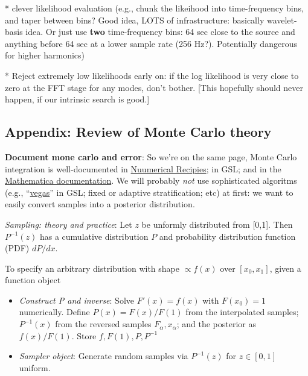 \documentclass[twocolumn,prd,nofootinbib]{revtex4}
\begin{document}

* clever likelihood evaluation (e.g., chunk the likeihood into time-frequency bins, and taper between bins? Good idea,
LOTS of infrastructure: basically wavelet-basis idea.  Or just use \textbf{two} time-frequency bins: 64 sec close to the
source and anything before 64 sec at a lower sample rate (256 Hz?).  Potentially dangerous for higher harmonics)

* Reject extremely low likelihoods early on: if the log likelihood is very close to zero at the FFT stage for any modes,
don't bother.  [This hopefully should never happen, if our intrinsic search is good.]




\subsection{Appendix: Review of Monte Carlo theory}

\noindent \textbf{Document mone carlo and error}: So we're on the same page, Monte Carlo integration is well-documented in \href{http://nr.com}{Nuumerical Recipies}; in
GSL; and in the \href{http://reference.wolfram.com/mathematica/tutorial/NIntegrateIntegrationStrategies.html}{Mathematica documentation}.  We will probably \emph{not} use sophisticated algoritms (e.g.,
``\href{http://www.gnu.org/software/gsl/manual/html_node/VEGAS.html#VEGAS}{vegas}'' in GSL; fixed or adaptive stratification; etc) at first: we want to easily convert samples into a posterior distribution.


\emph{Sampling: theory and practice}: Let $z$ be unformly distributed from [0,1]. Then $P^{-1}(z)$ has a cumulative distribution $P$
and probability distribution function (PDF) $dP/dx$.  

To specify an arbitrary distribution with shape $\propto f(x)$ over $[x_0,x_1]$, given a function object
\begin{itemize}
\item \emph{Construct P and inverse}: Solve $F'(x)=f(x)$ with $F(x_0)=1$ numerically.  Define $P(x)=F(x)/F(1)$ from the
  interpolated samples; $P^{-1}(x)$ from the reversed samples $F_\alpha,x_\alpha$; and the posterior as $f(x)/F(1)$.
  Store $f,F(1), P,P^{-1}$
\item \emph{Sampler object}: Generate random samples via $P^{-1}(z)$ for $z\in[0,1]$ uniform.
\end{itemize}
\end{document}
